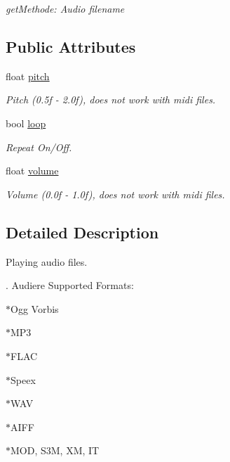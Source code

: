 \begin{DoxyCompactItemize}
\begin{DoxyCompactList}\small\item\em getMethode: Audio filename \item\end{DoxyCompactList}\end{DoxyCompactItemize}
\subsection*{Public Attributes}
\begin{DoxyCompactItemize}
\item 
\hypertarget{class_f2_c_1_1_audio_file_ad0ce4cee39219b8d70c5a6609d2ca377}{
float \hyperlink{class_f2_c_1_1_audio_file_ad0ce4cee39219b8d70c5a6609d2ca377}{pitch}}
\label{class_f2_c_1_1_audio_file_ad0ce4cee39219b8d70c5a6609d2ca377}

\begin{DoxyCompactList}\small\item\em Pitch (0.5f -\/ 2.0f), does not work with midi files. \item\end{DoxyCompactList}\item 
\hypertarget{class_f2_c_1_1_audio_file_a056116d003867cd170543451619ee661}{
bool \hyperlink{class_f2_c_1_1_audio_file_a056116d003867cd170543451619ee661}{loop}}
\label{class_f2_c_1_1_audio_file_a056116d003867cd170543451619ee661}

\begin{DoxyCompactList}\small\item\em Repeat On/Off. \item\end{DoxyCompactList}\item 
\hypertarget{class_f2_c_1_1_audio_file_afb17d9b8bffe29de4dad2c86919de313}{
float \hyperlink{class_f2_c_1_1_audio_file_afb17d9b8bffe29de4dad2c86919de313}{volume}}
\label{class_f2_c_1_1_audio_file_afb17d9b8bffe29de4dad2c86919de313}

\begin{DoxyCompactList}\small\item\em Volume (0.0f -\/ 1.0f), does not work with midi files. \item\end{DoxyCompactList}\end{DoxyCompactItemize}


\subsection{Detailed Description}
Playing audio files. \par
. Audiere Supported Formats: \par
 $\ast$Ogg Vorbis \par
 $\ast$MP3 \par
 $\ast$FLAC \par
 $\ast$Speex \par
 $\ast$WAV \par
 $\ast$AIFF \par
 $\ast$MOD, S3M, XM, IT \par
 

